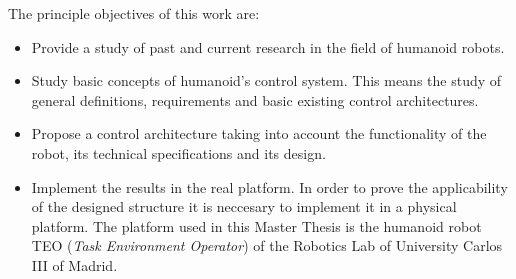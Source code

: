 The principle objectives of this work are:
\begin{itemize}
\item Provide a study of past and current research in the field of humanoid robots. 

\item Study basic concepts of humanoid's control system. This means the study of general definitions, requirements and basic existing control architectures.

\item Propose a control architecture taking into account the functionality of the robot, its technical specifications and its design.

\item Implement the results in the real platform. In order to prove the applicability of the designed structure it is neccesary to implement it in a physical platform. The platform used in this Master Thesis is the humanoid robot TEO (\textit{Task Environment Operator}) of the Robotics Lab of University Carlos III of Madrid.
\end{itemize}



